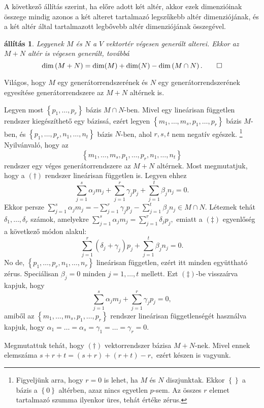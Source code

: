 \documentclass[a4paper, showtrims]{memoir}
\makeatletter
\renewenvironment{proof}[1][\proofname]
    {\par\pushQED{\qed}%
    \normalfont \topsep6\p@\@plus6\p@\relax
    \trivlist
    \item[\hskip\labelsep
        \itshape
    #1\@addpunct{:}]\ignorespaces}
    {\popQED\endtrivlist\@endpefalse}
\theoremstyle{plain}
\newtheorem{proposition}{állítás}[chapter]
\theoremstyle{remark}
\theoremstyle{definition}
\makeatother
\begin{document}
A következő állítás szerint,
ha előre adott két altér, akkor ezek dimenzióinak összege mindig azonos
a két alteret tartalmazó legszűkebb altér dimenziójának,
és a két altér által tartalmazott legbővebb altér  dimenziójának összegével.
\begin{proposition}\label{pr:drosszeg2}
	Legyenek $M$ és $N$ a $V$ vektortér végesen generált alterei.
	Ekkor az $M+N$ altér is végesen generált,
	továbbá
	\[
		\dim\left( M+N \right)=\dim(M)+\dim(N)-\dim \left( M\cap N \right).\qedhere
	\]
\end{proposition}
\begin{proof}
	Világos, hogy $M$ egy generátorrendszerének és $N$ egy generátorrendszerének egyesítése
	generátorrendszere az $M+N$ altérnek is.

	Legyen most $\left\{ p_1,\ldots,p_r \right\}$ bázis $M\cap N$-ben.
	Mivel egy lineárisan független rendszer kiegészíthető egy bázissá,
	ezért legyen
	$\left\{ m_1,\ldots,m_s,p_1,\ldots,p_r \right\}$ bázis $M$-ben,
	és
	$\left\{ p_1,\ldots,p_r,n_1,\ldots,n_t \right\}$ bázis $N$-ben,
	ahol $r,s,t$ nem negatív egészek.%
	\footnote{
		Figyeljünk arra, hogy $r=0$ is lehet, ha $M$ és $N$ diszjunktak.
		Ekkor $\left\{  \right\}$ a bázis a $\left\{ 0 \right\}$ altérben,
		azaz nincs egyetlen $p$-sem.
		Az összes $r$ elemet tartalmazó szumma ilyenkor üres, tehát értéke zérus.
	}
	Nyilvánvaló, hogy az
	\[
		\left\{ m_1,\ldots,m_s,p_1,\ldots,p_r,n_1,\ldots,n_t \right\}\tag{\dag}
	\]
	rendszer egy véges generátorrendszere az $M+N$ altérnek.
	Most megmutatjuk,
	hogy a $(\dag)$ rendszer lineárisan független is.
	Legyen ehhez
	\[
		\sum_{j=1}^s\alpha_j m_j+\sum_{j=1}^r\gamma_j p_j+\sum_{j=1}^t\beta_jn_j=0.\tag{\ddag}
	\]
	Ekkor persze
	\(
	\sum_{j=1}^s\alpha_j m_j =
	-\sum_{j=1}^r\gamma_j p_j
	-\sum_{j=1}^t\beta_jn_j
	\in
	M\cap N.
	\)
	Léteznek tehát $\delta_1,\ldots,\delta_r$ számok,
	amelyekre
	\(
	\sum_{j=1}^s\alpha_j m_j=
	\sum_{j=1}^r\delta_j p_j,
	\)
	emiatt a $(\ddag)$ egyenlőség a következő módon alakul:
	\[
		\sum_{j=1}^r\left( \delta_j+\gamma_j \right)p_j+\sum_{j=1}^t\beta_jn_j=0.
	\]
	No de, $\left\{ p_1,\ldots,p_r,n_1,\ldots,n_r \right\}$ lineárisan független,
	ezért itt minden együttható zérus.
	Speciálisan $\beta_j=0$ minden $j=1,\ldots,t$ mellett.
	Ezt $(\ddag)$-be visszaírva kapjuk, hogy
	\[
		\sum_{j=1}^s\alpha_j m_j+\sum_{j=1}^r\gamma_j p_j=0,
	\]
	amiből az $\left\{ m_1,\ldots,m_s,p_1,\ldots,p_r \right\}$ rendszer lineárisan függetlenségét használva kapjuk,
	hogy $\alpha_1=\dots=\alpha_s=\gamma_1=\dots=\gamma_r=0$.


	Megmutattuk tehát, hogy $(\dag)$ vektorrendszer bázisa $M+N$-nek.
	Mivel ennek elemszáma
	\begin{math}
		s+r+t=\left( s+r \right)+\left( r+t \right)-r,
	\end{math}
	ezért készen is vagyunk.
\end{proof}
\end{document}
